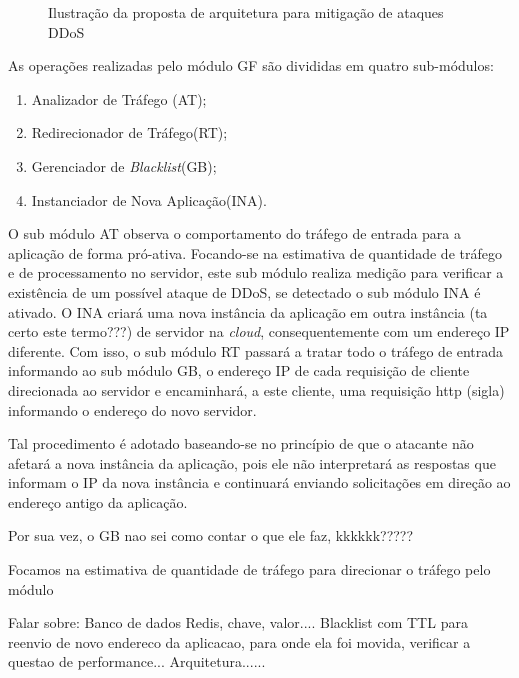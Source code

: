 \documentclass[a4paper, 12pt]{article}
\begin{document}
\begin{figure}[h!]
\centering
\caption{Ilustração da proposta de arquitetura para mitigação de ataques DDoS}
\label{fig:arq}
\end{figure}

As operações realizadas pelo módulo GF são divididas em quatro sub-módulos:

\begin{enumerate}[i]
  \item Analizador de Tráfego (AT);
  \item Redirecionador de Tráfego(RT);
  \item Gerenciador de \emph{Blacklist}(GB);
  \item Instanciador de Nova Aplicação(INA).
\end{enumerate}

O sub módulo AT observa o comportamento do tráfego de entrada para a aplicação de forma pró-ativa. Focando-se na estimativa de quantidade de tráfego e de processamento no servidor, este sub módulo realiza medição para verificar a existência de um possível ataque de DDoS, se detectado o sub módulo INA é ativado. O INA criará uma nova instância da aplicação em outra instância (ta certo este termo???) de servidor na \emph{cloud}, consequentemente com um endereço IP diferente.
Com isso, o sub módulo RT passará a tratar todo o tráfego de entrada informando ao sub módulo GB, o endereço IP de cada requisição de cliente direcionada ao servidor e encaminhará, a este cliente, uma requisição http (sigla) informando o endereço do novo servidor. 

Tal procedimento é adotado baseando-se no princípio de que o atacante não afetará a nova instância da aplicação, pois ele não interpretará as respostas que informam o IP da nova instância e continuará enviando solicitações em direção ao endereço antigo da aplicação.

 
Por sua vez, o GB nao sei como contar o que ele faz, kkkkkk????? 
 




Focamos na estimativa de quantidade de tráfego para direcionar o tráfego pelo módulo 


Falar sobre:
Banco de dados Redis, chave, valor....
Blacklist com TTL para reenvio de novo endereco da aplicacao, para onde ela foi movida, verificar a questao de performance...
Arquitetura......




% 


\end{document}
